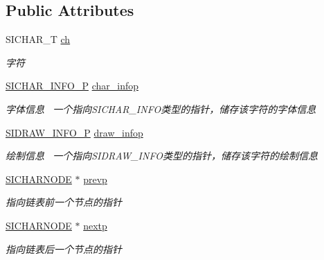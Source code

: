 \subsection*{Public Attributes}
\begin{DoxyCompactItemize}
\item 
S\+I\+C\+H\+A\+R\+\_\+T \hyperlink{class_s_i_c_h_a_r_n_o_d_e_a87aabfc0878d7c6cce226256873797e0}{ch}
\begin{DoxyCompactList}\small\item\em 字符 \end{DoxyCompactList}\item 
\hyperlink{class_s_i_c_h_a_r___i_n_f_o}{S\+I\+C\+H\+A\+R\+\_\+\+I\+N\+F\+O\+\_\+P} \hyperlink{class_s_i_c_h_a_r_n_o_d_e_a03e4b28edd8566a6b605f4caeeb7bd6f}{char\+\_\+infop}
\begin{DoxyCompactList}\small\item\em 字体信息~\newline
一个指向\+S\+I\+C\+H\+A\+R\+\_\+\+I\+N\+F\+O类型的指针，储存该字符的字体信息 \end{DoxyCompactList}\item 
\hyperlink{class_s_i_d_r_a_w___i_n_f_o}{S\+I\+D\+R\+A\+W\+\_\+\+I\+N\+F\+O\+\_\+P} \hyperlink{class_s_i_c_h_a_r_n_o_d_e_aee3adfece6b51d9f71a0aa19d203b106}{draw\+\_\+infop}
\begin{DoxyCompactList}\small\item\em 绘制信息~\newline
一个指向\+S\+I\+D\+R\+A\+W\+\_\+\+I\+N\+F\+O类型的指针，储存该字符的绘制信息 \end{DoxyCompactList}\item 
\mbox{\label{class_s_i_c_h_a_r_n_o_d_e_ad4d1b1aee15e867902bbf17938a86e64}} 
\hyperlink{class_s_i_c_h_a_r_n_o_d_e}{S\+I\+C\+H\+A\+R\+N\+O\+DE} $\ast$ \hyperlink{class_s_i_c_h_a_r_n_o_d_e_ad4d1b1aee15e867902bbf17938a86e64}{prevp}
\begin{DoxyCompactList}\small\item\em 指向链表前一个节点的指针 \end{DoxyCompactList}\item 
\mbox{\label{class_s_i_c_h_a_r_n_o_d_e_ab188ae5c7731bcc66a1042defcf158c8}} 
\hyperlink{class_s_i_c_h_a_r_n_o_d_e}{S\+I\+C\+H\+A\+R\+N\+O\+DE} $\ast$ \hyperlink{class_s_i_c_h_a_r_n_o_d_e_ab188ae5c7731bcc66a1042defcf158c8}{nextp}
\begin{DoxyCompactList}\small\item\em 指向链表后一个节点的指针 \end{DoxyCompactList}\end{DoxyCompactItemize}
